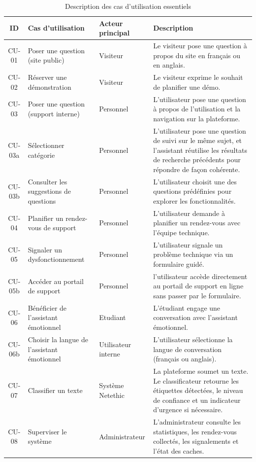 \vspace{6pt}
\begin{table}[H]
\caption{Description des cas d'utilisation essentiels}
\label{tab:cas_utilisation}
\centering
\small
\setlength{\tabcolsep}{3pt}
\begin{tabular}{|c|p{3cm}|p{2.8cm}|p{7.2cm}|}
\hline
\textbf{ID} & \textbf{Cas d'utilisation} & \textbf{Acteur principal} & \textbf{Description} \\
\hline
CU-01 & Poser une question (site public)
       & Visiteur
       & Le visiteur pose une question à propos du site en français ou en anglais. \\
\hline
CU-02 & Réserver une démonstration
       & Visiteur
       & Le visiteur exprime le souhait de planifier une démo. \\
\hline
CU-03 & Poser une question (support interne)
       & Personnel
       & L'utilisateur pose une question à propos de l'utilisation et la navigation sur la plateforme. \\
CU-03a & Sélectionner catégorie
        & Personnel
        & L'utilisateur pose une question de suivi sur le même sujet, et l'assistant réutilise les résultats de recherche précédents pour répondre de façon cohérente. \\
\hline
CU-03b & Consulter les suggestions de questions
        & Personnel
        & L'utilisateur choisit une des questions prédéfinies pour explorer les fonctionnalités. \\
\hline
CU-04 & Planifier un rendez-vous de support
       & Personnel
       & L'utilisateur demande à planifier un rendez-vous avec l'équipe technique.
         \\
\hline
CU-05 & Signaler un dysfonctionnement
       & Personnel
       & L'utilisateur signale un problème technique via un formulaire guidé. \\
\hline
CU-05b & Accéder au portail de support
        & Personnel
        & l'utilisateur accède directement au portail de support en ligne sans passer par le formulaire. \\
\hline
CU-06 & Bénéficier de l'assistant émotionnel
       & Etudiant
       & L'étudiant engage une conversation avec l'assistant émotionnel. \\
\hline
CU-06b & Choisir la langue de l'assistant émotionnel
        & Utilisateur interne
        &L'utilisateur sélectionne la langue de conversation (français ou anglais). \\
\hline
CU-07 & Classifier un texte
       & Système Netethic
       & La plateforme soumet un texte. Le classificateur retourne les étiquettes détectées,
         le niveau de confiance et un indicateur d'urgence si nécessaire. \\
\hline
CU-08 & Superviser le système
       & Administrateur
       & L'administrateur consulte les statistiques, les rendez-vous collectés,
         les signalements et l'état des caches. \\
\hline
\end{tabular}
\end{table}

